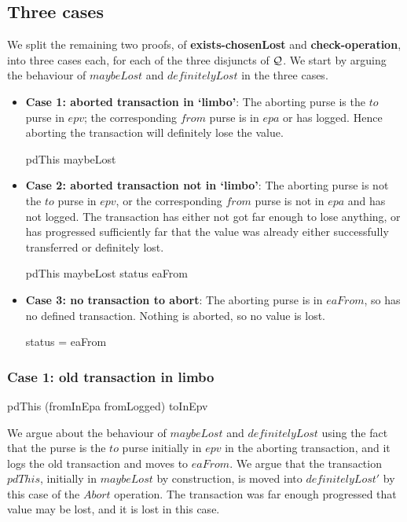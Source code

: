 \subsection{Three cases}
We split the remaining two proofs, of {\bf exists-chosenLost} and
{\bf
  check-operation}, into three cases each, for each of the three
disjuncts of $\mathcal{Q}$.  We start by arguing the behaviour
of $maybeLost$ and $definitelyLost$ in the three cases.
\begin{itemize}
\item {\bf Case 1: aborted transaction in `limbo'}: The aborting purse
  is the $to$ purse in $epv$; the corresponding $from$ purse is in
  $epa$ or has logged.  Hence aborting the transaction will definitely
  lose the value.
  \begin{gzed}
  pdThis \in maybeLost
  \end{gzed}
\item {\bf Case 2: aborted transaction not in `limbo'}: The aborting
  purse is not the $to$ purse in $epv$, or the corresponding $from$
  purse is not in $epa$ and has not logged.  The transaction has
  either not got far enough to lose anything, or has progressed
  sufficiently far that the value was already either successfully
  transferred or definitely lost.
  \begin{gzed}
  pdThis \notin maybeLost \land status \neq eaFrom
  \end{gzed}
\item {\bf Case 3: no transaction to abort}: The aborting purse is in
  $eaFrom$, so has no defined transaction.  Nothing is aborted, so no
  value is lost.
  \begin{gzed}
  status = eaFrom
  \end{gzed}
\end{itemize}
\subsubsection{Case 1: old transaction in limbo}
\label{abort-inlimbo}
\begin{gzed}
pdThis \in (fromInEpa \cup fromLogged) \cap toInEpv
\end{gzed}
We argue about the behaviour of $maybeLost$ and $definitelyLost$
using the fact that the purse is the $to$ purse initially in $epv$
in the aborting transaction, and it logs the old transaction and
moves to $eaFrom$.  We argue that the transaction $pdThis$,
initially in $maybeLost$ by construction, is moved into
$definitelyLost'$ by this case of the $Abort$ operation.  The
transaction was far enough progressed that value may be lost, and it
is lost in this case.

